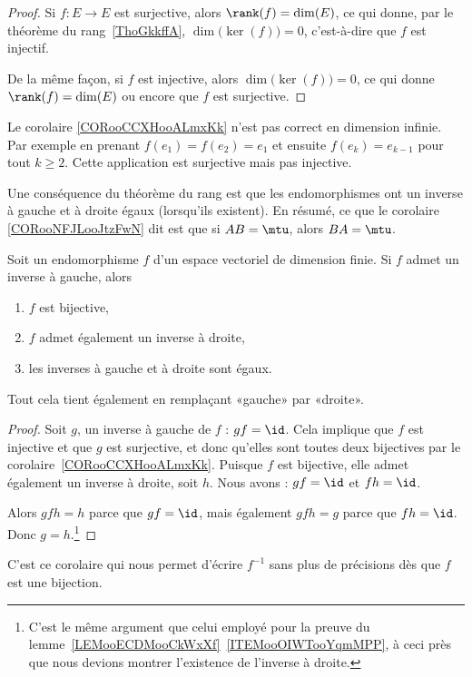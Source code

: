 \begin{proof}
	Si \( f\colon E\to E\) est surjective, alors \( \rank(f)=\dim(E)\), ce qui donne, par le théorème du rang~\ref{ThoGkkffA}, \( \dim\big( \ker(f) \big)=0\), c'est-à-dire que \( f\) est injectif.

	De la même façon, si \( f\) est injective, alors \( \dim\big( \ker(f) \big)=0\), ce qui donne \( \rank(f)=\dim(E)\) ou encore que \( f\) est surjective.
\end{proof}

\begin{example}
	Le corolaire \ref{CORooCCXHooALmxKk} n'est pas correct en dimension infinie. Par exemple en prenant \( f(e_1)=f(e_2)=e_1\) et ensuite \( f(e_k)=e_{k-1}\) pour tout \( k\geq 2\). Cette application est surjective mais pas injective.
\end{example}

Une conséquence du théorème du rang est que les endomorphismes ont un inverse à gauche et à droite égaux (lorsqu'ils existent). En résumé, ce que le corolaire \ref{CORooNFJLooJtzFwN} dit est que si \( AB=\mtu\), alors \( BA=\mtu\).
\begin{corollary}           \label{CORooNFJLooJtzFwN}
	Soit un endomorphisme \( f\) d'un espace vectoriel de dimension finie. Si \( f\) admet un inverse à gauche, alors
	\begin{enumerate}
		\item
		      \( f\) est bijective,
		\item
		      \( f\) admet également un inverse à droite,
		\item
		      les inverses à gauche et à droite sont égaux.
	\end{enumerate}
	Tout cela tient également en remplaçant «gauche» par «droite».
\end{corollary}

\begin{proof}
	Soit \( g\), un inverse à gauche de \( f\) : \( gf=\id\). Cela implique que \( f\) est injective et que \( g\) est surjective, et donc qu'elles sont toutes deux bijectives par le corolaire~\ref{CORooCCXHooALmxKk}. Puisque \( f\) est bijective, elle admet également un inverse à droite, soit \( h\). Nous avons : \( gf=\id\) et \( fh=\id\).

	Alors \( gfh=h\) parce que \( gf=\id\), mais également \( gfh=g\) parce que \( fh=\id\). Donc \( g=h\).\footnote{C'est le même argument que celui employé pour la preuve du lemme~\ref{LEMooECDMooCkWxXf}~\ref{ITEMooOIWTooYqmMPP}, à ceci près que nous devions montrer l'existence de l'inverse à droite.}
\end{proof}
C'est ce corolaire qui nous permet d'écrire \( f^{-1}\) sans plus de précisions dès que \( f\) est une bijection.

